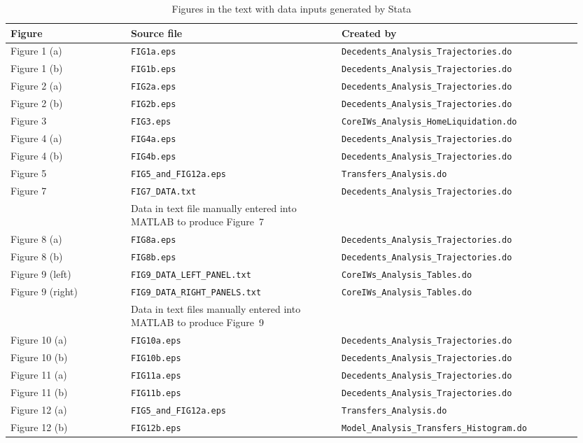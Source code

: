 \documentclass[a4,12p]{article}
\begin{document}
\begin{landscape}
\begin{table}[ht]
\caption{Figures in the text with data inputs generated by Stata \label{Tab:TextFigures}}
\begin{tabular}{p{0.20\linewidth} p{0.35\linewidth} p{0.40\linewidth}}
\toprule
Figure & Source file & Created by \\
\midrule
Figure 1 (a) & {\tt FIG1a.eps} & {\tt Decedents\_Analysis\_Trajectories.do} \\
Figure 1 (b) & {\tt FIG1b.eps} & {\tt Decedents\_Analysis\_Trajectories.do} \\
\midrule
Figure 2 (a) & {\tt FIG2a.eps} & {\tt Decedents\_Analysis\_Trajectories.do} \\
Figure 2 (b) & {\tt FIG2b.eps} & {\tt Decedents\_Analysis\_Trajectories.do} \\
\midrule
Figure 3 & {\tt FIG3.eps} & {\tt CoreIWs\_Analysis\_HomeLiquidation.do} \\
\midrule
Figure 4 (a) & {\tt FIG4a.eps} & {\tt Decedents\_Analysis\_Trajectories.do} \\
Figure 4 (b) & {\tt FIG4b.eps} & {\tt Decedents\_Analysis\_Trajectories.do} \\
\midrule
Figure 5 & {\tt FIG5\_and\_FIG12a.eps} & {\tt Transfers\_Analysis.do} \\
\midrule
Figure 7 & {\tt FIG7\_DATA.txt} & {\tt Decedents\_Analysis\_Trajectories.do} \\
 & Data in text file manually entered into MATLAB to produce Figure~7 & \\
\midrule
Figure 8 (a) & {\tt FIG8a.eps} & {\tt Decedents\_Analysis\_Trajectories.do} \\
Figure 8 (b) & {\tt FIG8b.eps} & {\tt Decedents\_Analysis\_Trajectories.do} \\
\midrule
Figure 9 (left) & {\tt FIG9\_DATA\_LEFT\_PANEL.txt} & {\tt CoreIWs\_Analysis\_Tables.do} \\
Figure 9 (right) & {\tt FIG9\_DATA\_RIGHT\_PANELS.txt} & {\tt CoreIWs\_Analysis\_Tables.do} \\
 & Data in text files manually entered into MATLAB to produce Figure~9 & \\
\midrule
Figure 10 (a) & {\tt FIG10a.eps} & {\tt Decedents\_Analysis\_Trajectories.do} \\
Figure 10 (b) & {\tt FIG10b.eps} & {\tt Decedents\_Analysis\_Trajectories.do} \\
\midrule
Figure 11 (a) & {\tt FIG11a.eps} & {\tt Decedents\_Analysis\_Trajectories.do} \\
Figure 11 (b) & {\tt FIG11b.eps} & {\tt Decedents\_Analysis\_Trajectories.do} \\
\midrule
Figure 12 (a) & {\tt FIG5\_and\_FIG12a.eps} & {\tt Transfers\_Analysis.do} \\
Figure 12 (b) & {\tt FIG12b.eps} & {\tt Model\_Analysis\_Transfers\_Histogram.do} \\
\bottomrule
\end{tabular}
\end{table}
\end{landscape}
\end{document}
